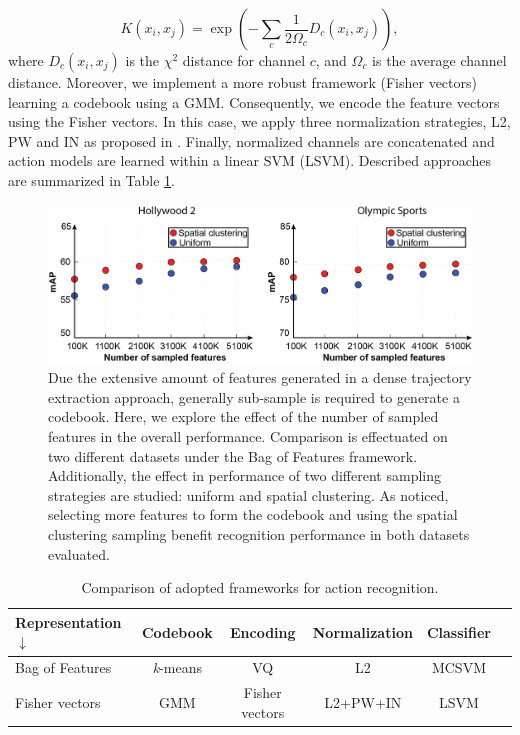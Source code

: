 \begin{equation}
K(x_i,x_j)= \exp(-\sum_c {\frac{1}{2\Omega_c} D_c(x_i,x_j)}),
\label{eq:multichannel}
\end{equation}
where $D_c(x_i,x_j)$ is the $\chi^2$ distance for channel $c$, and $\Omega_c$ is the average channel distance. Moreover, we implement a more robust framework (Fisher vectors) learning a codebook using a GMM. Consequently, we encode the feature vectors using the Fisher vectors. In this case, we apply three normalization strategies, L2, PW and IN as proposed in \cite{xwang2013}. Finally, normalized channels are concatenated and action models are learned within a linear SVM (LSVM). Described approaches are summarized in Table \ref{tab:frameworks}.

\begin{figure}[t!]
\begin{center}
\includegraphics[width=0.98\linewidth]{fig/sampling.png}
\end{center}
\caption{Due the extensive amount of features generated in a dense trajectory extraction approach, generally sub-sample is required to generate a codebook. Here, we explore the effect of the number of sampled features in the overall performance. Comparison is effectuated on two different datasets under the Bag of Features framework. Additionally, the effect in performance of two different sampling strategies are studied: uniform and spatial clustering. As noticed, selecting more features to form the codebook and using the spatial clustering sampling benefit recognition performance in both datasets evaluated.}
\label{fig:feature_sampling}
\end{figure}


\begin{table}[h!]
\caption{Comparison of adopted frameworks for action recognition.}
\begin{center}
{
\begin{tabular}{ l| c c c c c }
\hline
Representation $\downarrow$ & Codebook & Encoding & Normalization & Classifier \\
\hline
Bag of Features & \textit{k}-means & VQ & L2 & MCSVM \\
Fisher vectors & GMM & Fisher vectors & L2+PW+IN & LSVM \\
\hline
\end{tabular}
}
\end{center}
\label{tab:frameworks}
\end{table}



